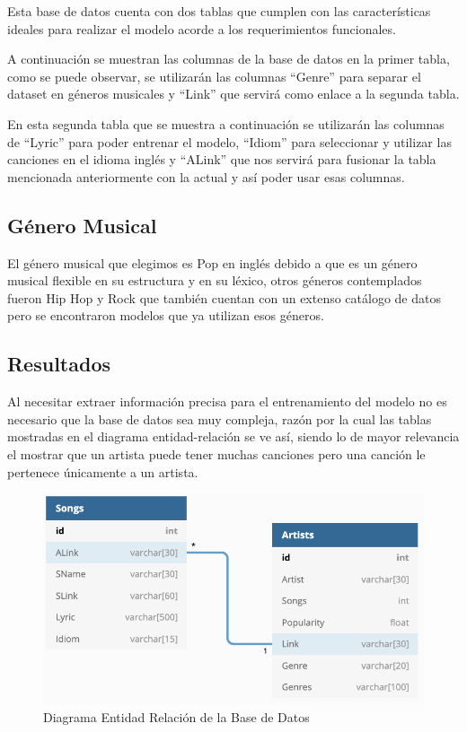 \documentclass[12pt, a4paper, titlepage]{report}
\begin{document}
		Esta base de datos cuenta con dos tablas que cumplen con las características ideales para realizar el modelo acorde a los requerimientos funcionales.
		
		A continuación se muestran las columnas de la base de datos en la primer tabla, como se puede observar, se utilizarán las columnas “Genre” para separar el dataset en géneros musicales y “Link” que servirá como enlace a la segunda tabla.
		
		
		En esta segunda tabla que se muestra a continuación se utilizarán las columnas de “Lyric” para poder entrenar el modelo, “Idiom” para seleccionar y utilizar las canciones en el idioma inglés y “ALink” que nos servirá para fusionar la tabla mencionada anteriormente con la actual y así poder usar esas columnas.
		
		
		\subsection{Género Musical} %
		El género musical que elegimos es Pop en inglés debido a que es un género musical flexible en su estructura y en su léxico, otros géneros contemplados fueron Hip Hop y Rock que también cuentan con un extenso catálogo de datos pero se encontraron modelos que ya utilizan esos géneros.
		
		\subsection{Resultados}
		Al necesitar extraer información precisa para el entrenamiento del modelo no es necesario que la base de datos sea muy compleja, razón por la cual las tablas mostradas en el diagrama entidad-relación se ve así, siendo lo de mayor relevancia el mostrar que un artista puede tener muchas canciones pero una canción le pertenece únicamente a un artista.
		
		\begin{figure}[H]
			\includegraphics[width=15cm]{./imagenes/Disenio/Iteracion_1/Base_de_Datos/diagrama_ER_BD.jpg}
			\centering 
			\caption{Diagrama Entidad Relación de la Base de Datos}
		\end{figure}
		
\end{document}
